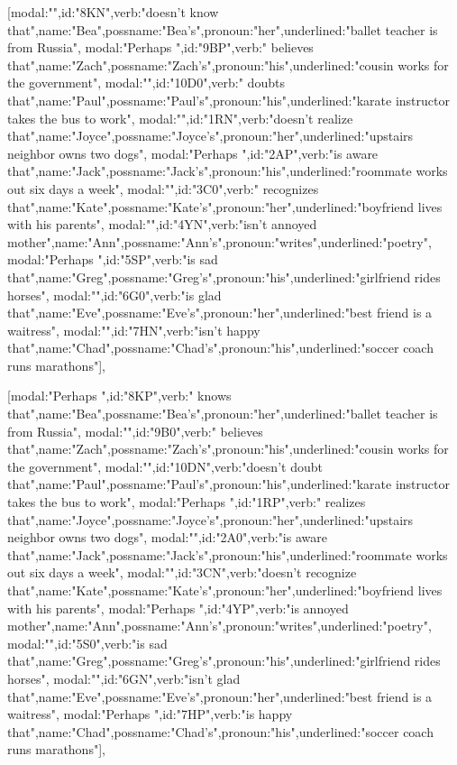 [{modal:"",id:"8KN",verb:"doesn't know that",name:"Bea",possname:"Bea's",pronoun:"her",underlined:"ballet teacher is from Russia"},
{modal:"Perhaps ",id:"9BP",verb:" believes that",name:"Zach",possname:"Zach's",pronoun:"his",underlined:"cousin works for the government"},
{modal:"",id:"10D0",verb:" doubts that",name:"Paul",possname:"Paul's",pronoun:"his",underlined:"karate instructor takes the bus to work"},
{modal:"",id:"1RN",verb:"doesn't realize that",name:"Joyce",possname:"Joyce's",pronoun:"her",underlined:"upstairs neighbor owns two dogs"},
{modal:"Perhaps ",id:"2AP",verb:"is aware that",name:"Jack",possname:"Jack's",pronoun:"his",underlined:"roommate works out six days a week"},
{modal:"",id:"3C0",verb:" recognizes that",name:"Kate",possname:"Kate's",pronoun:"her",underlined:"boyfriend lives with his parents"},
{modal:"",id:"4YN",verb:"isn't annoyed mother",name:"Ann",possname:"Ann's",pronoun:"writes",underlined:"poetry"},
{modal:"Perhaps ",id:"5SP",verb:"is sad that",name:"Greg",possname:"Greg's",pronoun:"his",underlined:"girlfriend rides horses"},
{modal:"",id:"6G0",verb:"is glad that",name:"Eve",possname:"Eve's",pronoun:"her",underlined:"best friend is a waitress"},
{modal:"",id:"7HN",verb:"isn't happy that",name:"Chad",possname:"Chad's",pronoun:"his",underlined:"soccer coach runs marathons"}],

[{modal:"Perhaps ",id:"8KP",verb:" knows that",name:"Bea",possname:"Bea's",pronoun:"her",underlined:"ballet teacher is from Russia"},
{modal:"",id:"9B0",verb:" believes that",name:"Zach",possname:"Zach's",pronoun:"his",underlined:"cousin works for the government"},
{modal:"",id:"10DN",verb:"doesn't doubt that",name:"Paul",possname:"Paul's",pronoun:"his",underlined:"karate instructor takes the bus to work"},
{modal:"Perhaps ",id:"1RP",verb:" realizes that",name:"Joyce",possname:"Joyce's",pronoun:"her",underlined:"upstairs neighbor owns two dogs"},
{modal:"",id:"2A0",verb:"is aware that",name:"Jack",possname:"Jack's",pronoun:"his",underlined:"roommate works out six days a week"},
{modal:"",id:"3CN",verb:"doesn't recognize that",name:"Kate",possname:"Kate's",pronoun:"her",underlined:"boyfriend lives with his parents"},
{modal:"Perhaps ",id:"4YP",verb:"is annoyed mother",name:"Ann",possname:"Ann's",pronoun:"writes",underlined:"poetry"},
{modal:"",id:"5S0",verb:"is sad that",name:"Greg",possname:"Greg's",pronoun:"his",underlined:"girlfriend rides horses"},
{modal:"",id:"6GN",verb:"isn't glad that",name:"Eve",possname:"Eve's",pronoun:"her",underlined:"best friend is a waitress"},
{modal:"Perhaps ",id:"7HP",verb:"is happy that",name:"Chad",possname:"Chad's",pronoun:"his",underlined:"soccer coach runs marathons"}],

